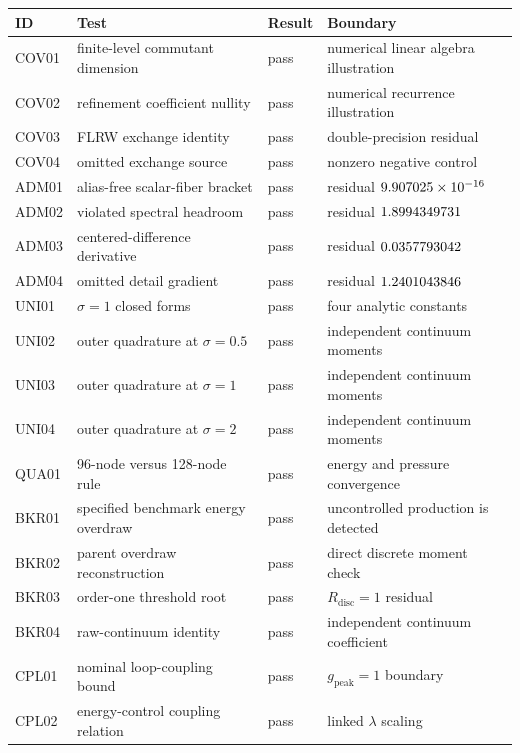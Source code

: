 \begin{longtable}{@{}P{0.13\textwidth}P{0.38\textwidth}P{0.15\textwidth}P{0.24\textwidth}@{}}
\toprule
ID & Test & Result & Boundary\\
\midrule
COV01 & finite-level commutant dimension & pass & numerical linear algebra illustration\\
COV02 & refinement coefficient nullity & pass & numerical recurrence illustration\\
COV03 & FLRW exchange identity & pass & double-precision residual\\
COV04 & omitted exchange source & pass & nonzero negative control\\
ADM01 & alias-free scalar-fiber bracket & pass & residual \(9.907025\times 10^{-16}\)\\
ADM02 & violated spectral headroom & pass & residual \(1.8994349731\)\\
ADM03 & centered-difference derivative & pass & residual \(0.0357793042\)\\
ADM04 & omitted detail gradient & pass & residual \(1.2401043846\)\\
UNI01 & \(\sigma=1\) closed forms & pass & four analytic constants\\
UNI02 & outer quadrature at \(\sigma=0.5\) & pass & independent continuum moments\\
UNI03 & outer quadrature at \(\sigma=1\) & pass & independent continuum moments\\
UNI04 & outer quadrature at \(\sigma=2\) & pass & independent continuum moments\\
QUA01 & 96-node versus 128-node rule & pass & energy and pressure convergence\\
BKR01 & specified benchmark energy overdraw & pass & uncontrolled production is detected\\
BKR02 & parent overdraw reconstruction & pass & direct discrete moment check\\
BKR03 & order-one threshold root & pass & \(R_{\mathrm{disc}}=1\) residual\\
BKR04 & raw-continuum identity & pass & independent continuum coefficient\\
CPL01 & nominal loop-coupling bound & pass & \(g_{\mathrm{peak}}=1\) boundary\\
CPL02 & energy-control coupling relation & pass & linked \(\lambda\) scaling\\
\bottomrule
\end{longtable}

